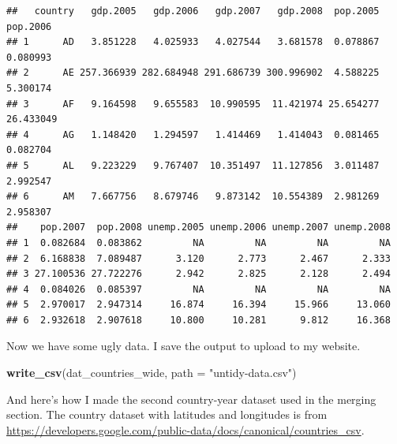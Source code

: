 \documentclass[12pt,oneside,openany]{book}
\newenvironment{Shaded}{\begin{snugshade}}{\end{snugshade}}
\newcommand{\KeywordTok}[1]{\textcolor[rgb]{0.13,0.29,0.53}{\textbf{#1}}}
\newcommand{\DataTypeTok}[1]{\textcolor[rgb]{0.13,0.29,0.53}{#1}}
\newcommand{\DecValTok}[1]{\textcolor[rgb]{0.00,0.00,0.81}{#1}}
\newcommand{\StringTok}[1]{\textcolor[rgb]{0.31,0.60,0.02}{#1}}
\newcommand{\OperatorTok}[1]{\textcolor[rgb]{0.81,0.36,0.00}{\textbf{#1}}}
\newcommand{\NormalTok}[1]{#1}
\begin{document}
\begin{verbatim}
##   country   gdp.2005   gdp.2006   gdp.2007   gdp.2008  pop.2005  pop.2006
## 1      AD   3.851228   4.025933   4.027544   3.681578  0.078867  0.080993
## 2      AE 257.366939 282.684948 291.686739 300.996902  4.588225  5.300174
## 3      AF   9.164598   9.655583  10.990595  11.421974 25.654277 26.433049
## 4      AG   1.148420   1.294597   1.414469   1.414043  0.081465  0.082704
## 5      AL   9.223229   9.767407  10.351497  11.127856  3.011487  2.992547
## 6      AM   7.667756   8.679746   9.873142  10.554389  2.981269  2.958307
##    pop.2007  pop.2008 unemp.2005 unemp.2006 unemp.2007 unemp.2008
## 1  0.082684  0.083862         NA         NA         NA         NA
## 2  6.168838  7.089487      3.120      2.773      2.467      2.333
## 3 27.100536 27.722276      2.942      2.825      2.128      2.494
## 4  0.084026  0.085397         NA         NA         NA         NA
## 5  2.970017  2.947314     16.874     16.394     15.966     13.060
## 6  2.932618  2.907618     10.800     10.281      9.812     16.368
\end{verbatim}

Now we have some ugly data. I save the output to upload to my website.

\begin{Shaded}
\begin{Highlighting}[]
\KeywordTok{write_csv}\NormalTok{(dat_countries_wide, }\DataTypeTok{path =} \StringTok{"untidy-data.csv"}\NormalTok{)}
\end{Highlighting}
\end{Shaded}

And here's how I made the second country-year dataset used in the
merging section. The country dataset with latitudes and longitudes is
from
\url{https://developers.google.com/public-data/docs/canonical/countries_csv}.

\begin{Shaded}
\end{Shaded}
\end{document}
